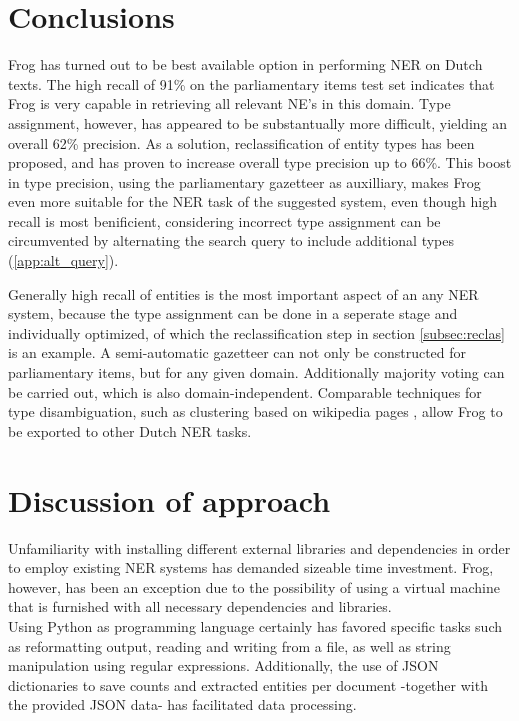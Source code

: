 \section{Conclusions}
\label{sec:conc}
Frog has turned out to be best available option in performing NER on Dutch texts.
The high recall of 91\% on the parliamentary items test set indicates that Frog is very capable in retrieving all relevant NE's in this domain. Type assignment, however, has appeared to be substantually more difficult, yielding an overall 62\% precision. As a solution, reclassification of entity types has been proposed, and has proven to  increase overall type precision up to 66\%. This boost in type precision, using the parliamentary gazetteer as auxilliary, makes Frog even more suitable for the NER task of the suggested system, even though high recall is most benificient, considering incorrect type assignment can be circumvented by alternating the search query to include additional types (\ref{app:alt_query}). 

Generally high recall of entities is the most important aspect of an any NER system, because the type assignment can be done in a seperate stage and individually optimized, of which the reclassification step in section \ref{subsec:reclas} is an example.  
A semi-automatic gazetteer can not only be constructed for parliamentary items, but for any given domain. Additionally majority voting can be carried out, which is also domain-independent. Comparable techniques for type disambiguation, such as clustering based on wikipedia pages \cite{cucerzan2007large},  allow Frog to be exported to other Dutch NER tasks.

\section{Discussion of approach}
\label{sec:disc}
Unfamiliarity with installing different external libraries and dependencies in order to employ existing NER systems has demanded sizeable time investment. Frog, however, has been an exception due to the possibility of using a virtual machine that is furnished with all necessary dependencies and libraries. \\
Using Python as programming language certainly has favored specific tasks such as reformatting output, reading and writing from a file, as well as string manipulation using regular expressions. Additionally, the use of JSON dictionaries to save counts and extracted entities per document -together with the provided JSON data- has facilitated data processing.

